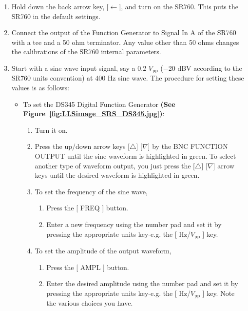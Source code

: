 \documentclass{../lab}
\begin{document}
\begin{enumerate}
    \item Hold down the back arrow key, [$\leftarrow$], and turn on the SR760. This puts the SR760 in the default settings.

    \item Connect the output of the Function Generator to Signal In A of the SR760 with a tee and a 50 ohm terminator. Any value other than 50 ohms changes the calibrations of the SR760 internal parameters.

    \item Start with a sine wave input signal, say a 0.2 $V_\text{pp}$ ($-$20 dBV according to the SR760 units convention) at 400 Hz sine wave. The procedure for setting these values is as follows:
    \begin{itemize}
        \item To set the DS345 Digital Function Generator \textbf{(See Figure~\ref{fig:LLSimage_SRS_DS345.jpg})}:
        \begin{enumerate}
            \item Turn it on.

            \item Press the up/down arrow keys [$\triangle$] [$\nabla$] by the BNC FUNCTION OUTPUT until the sine waveform is highlighted in green. To select another type of waveform output, you just press the [$\triangle$] [$\nabla$] arrow keys until the desired waveform is highlighted in green.

            \item To set the frequency of the sine wave,
            \begin{enumerate}
                \item Press the [ FREQ ] button.

                \item Enter a new frequency using the number pad and set it by pressing the appropriate units key-e.g. the [ Hz/$V_\text{pp}$ ] key.

            \end{enumerate}

            \item To set the amplitude of the output waveform,
            \begin{enumerate}
                \item Press the [ AMPL ] button.

                \item Enter the desired amplitude using the number pad and set it by pressing the appropriate units key-e.g. the [ Hz/$V_\text{pp}$ ] key. Note the various choices you have.


\end{enumerate}
\end{enumerate}
\end{itemize}
\end{enumerate}
\end{document}
